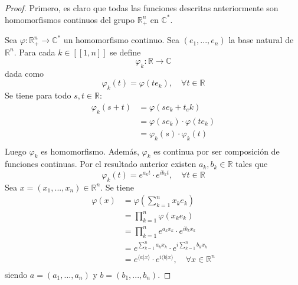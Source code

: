 \documentclass[12pt]{report}
\theoremstyle{largebreak}
\newcommand\cf[3]{\ensuremath{#1:#2\rightarrow#3}}
\newcommand\pint[2]{\ensuremath{\langle#1| #2\rangle}}
\newcommand{\natint}[1]{\ensuremath{\left[\!\left[#1\right]\!\right]}}
\begin{document}
    \begin{proof}
        Primero, es claro que todas las funciones descritas anteriormente son homomorfismos continuos del grupo $\mathbb{R}^n_+$ en $\mathbb{C}^*$.

        Sea $\cf{\varphi}{\mathbb{R}^n_+}{\mathbb{C}^*}$ un homomorfismo continuo. Sea $(e_1,...,e_n)$ la base natural de $\mathbb{R}^n$. Para cada $k\in\natint{1,n}$ se define
        \begin{equation*}
            \cf{\varphi_k}{\mathbb{R}}{\mathbb{C}}
        \end{equation*}
        dada como
        \begin{equation*}
            \varphi_k(t)=\varphi(te_k),\quad\forall t\in\mathbb{R}
        \end{equation*}
        Se tiene para todo $s,t\in\mathbb{R}$:
        \begin{equation*}
            \begin{split}
                \varphi_k(s+t)&=\varphi(se_k+t_ek)\\
                &=\varphi(se_k)\cdot\varphi(te_k)\\
                &=\varphi_k(s)\cdot\varphi_k(t)\\
            \end{split}
        \end{equation*}
        Luego $\varphi_k$ es homomorfismo. Además, $\varphi_k$ es continua por ser composición de funciones continuas. Por el resultado anterior existen $a_k,b_k\in\mathbb{R}$ tales que
        \begin{equation*}
            \varphi_k(t)=e^{ a_kt}\cdot e^{ib_kt},\quad\forall t\in\mathbb{R}
        \end{equation*}
        Sea $x=(x_1,...,x_n)\in\mathbb{R}^n$. Se tiene
        \begin{equation*}
            \begin{split}
                \varphi(x)&=\varphi\left(\sum_{ k=1}^n x_ke_k \right)\\
                &=\prod_{ k=1}^n \varphi(x_ke_k)\\
                &=\prod_{ k=1}^n e^{ a_kx_k}\cdot e^{ib_kx_k}\\
                &=e^{\sum_{ k=1}^n a_kx_k}\cdot e^{i\sum_{ k=1}^n b_kx_k}\\
                &=e^{\pint{a}{x}}\cdot e^{i\pint{b}{x}},\quad\forall x\in\mathbb{R}^n \\
            \end{split}
        \end{equation*}
        siendo $a=(a_1,...,a_n)$ y $b=(b_1,...,b_n)$.
    \end{proof}
\end{document}
